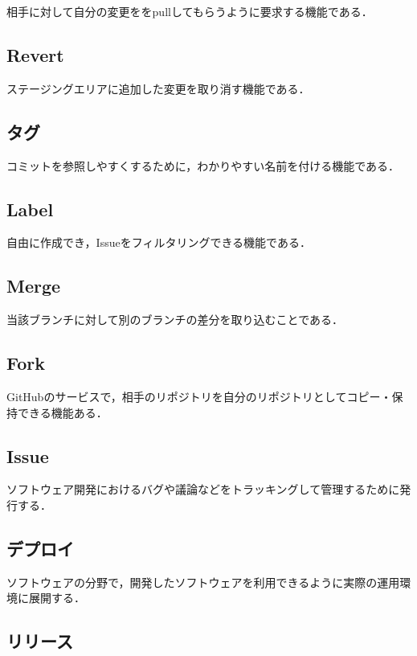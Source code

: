 相手に対して自分の変更ををpullしてもらうように要求する機能である．


\subsection{Revert}

ステージングエリアに追加した変更を取り消す機能である．

\subsection{タグ}

コミットを参照しやすくするために，わかりやすい名前を付ける機能である．


\subsection{Label}

自由に作成でき，Issueをフィルタリングできる機能である．


\subsection{Merge}

当該ブランチに対して別のブランチの差分を取り込むことである．


\subsection{Fork}

GitHubのサービスで，相手のリポジトリを自分のリポジトリとしてコピー・保持できる機能ある．


\subsection{Issue}

ソフトウェア開発におけるバグや議論などをトラッキングして管理するために発行する．

\subsection{デプロイ}

ソフトウェアの分野で，開発したソフトウェアを利用できるように実際の運用環境に展開する．


\subsection{リリース}

